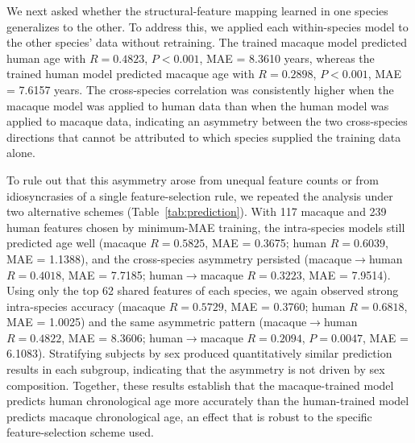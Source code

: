 \documentclass[11pt]{article}
\begin{document}
We next asked whether the structural-feature mapping learned in one species generalizes to the other. To address this, we applied each within-species model to the other species' data without retraining. The trained macaque model predicted human age with $R = 0.4823$, $P < 0.001$, MAE = 8.3610 years, whereas the trained human model predicted macaque age with $R = 0.2898$, $P < 0.001$, MAE = 7.6157 years. The cross-species correlation was consistently higher when the macaque model was applied to human data than when the human model was applied to macaque data, indicating an asymmetry between the two cross-species directions that cannot be attributed to which species supplied the training data alone.

To rule out that this asymmetry arose from unequal feature counts or from idiosyncrasies of a single feature-selection rule, we repeated the analysis under two alternative schemes (Table~\ref{tab:prediction}). With 117 macaque and 239 human features chosen by minimum-MAE training, the intra-species models still predicted age well (macaque $R = 0.5825$, MAE = 0.3675; human $R = 0.6039$, MAE = 1.1388), and the cross-species asymmetry persisted (macaque$\to$human $R = 0.4018$, MAE = 7.7185; human$\to$macaque $R = 0.3223$, MAE = 7.9514). Using only the top 62 shared features of each species, we again observed strong intra-species accuracy (macaque $R = 0.5729$, MAE = 0.3760; human $R = 0.6818$, MAE = 1.0025) and the same asymmetric pattern (macaque$\to$human $R = 0.4822$, MAE = 8.3606; human$\to$macaque $R = 0.2094$, $P = 0.0047$, MAE = 6.1083). Stratifying subjects by sex produced quantitatively similar prediction results in each subgroup, indicating that the asymmetry is not driven by sex composition. Together, these results establish that the macaque-trained model predicts human chronological age more accurately than the human-trained model predicts macaque chronological age, an effect that is robust to the specific feature-selection scheme used.
\end{document}

